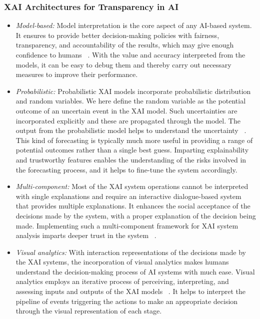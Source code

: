 \documentclass[journal]{IEEEtran}
\begin{document}
\subsubsection{XAI Architectures for Transparency in AI}

\begin{itemize}

    \item \textit{Model-based:} Model interpretation is the core aspect of any AI-based system. It ensures to provide better decision-making policies with fairness, transparency, and accountability of the results, which may give enough confidence to humans ~\cite{yang2022design}. With the value and accuracy interpreted from the models, it can be easy to debug them and thereby carry out necessary measures to improve their performance.

    \item \textit{Probabilistic:} Probabilistic XAI models incorporate probabilistic distribution and random variables. We here define the random variable as the potential outcome of an uncertain event in the XAI model. Such uncertainties are incorporated explicitly and these are propagated through the model. The output from the probabilistic model helps to understand the uncertainty ~\cite{konforti2022sign}. This kind of forecasting is typically much more useful in providing a range of potential outcomes rather than a single best guess. Imparting explainability and trustworthy features enables the understanding of the risks involved in the forecasting process, and it helps to fine-tune the system accordingly.  
    
    \item \textit{Multi-component:} Most of the XAI system operations cannot be interpreted with single explanations and require an interactive dialogue-based system that provides multiple explanations. It enhances the social acceptance of the decisions made by the system, with a proper explanation of the decision being made. Implementing such a multi-component framework for XAI system analysis imparts deeper trust in the system ~\cite{kim2021multi}.
    
    \item \textit{Visual analytics:} With interaction representations of the decisions made by the XAI systems, the incorporation of visual analytics makes humans understand the decision-making process of AI systems with much ease. Visual analytics employs an iterative process of perceiving, interpreting, and assessing inputs and outputs of the XAI models ~\cite{andrienko2022visual}. It helps to interpret the pipeline of events triggering the actions to make an appropriate decision through the visual representation of each stage. 
    

\end{itemize}
\end{document}
